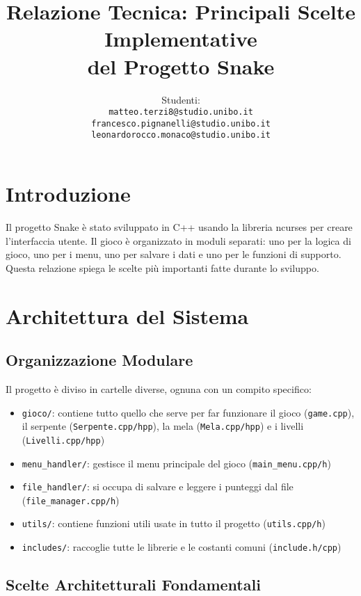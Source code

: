 \documentclass[a4paper,12pt]{article}
\title{Relazione Tecnica: Principali Scelte Implementative\\del Progetto Snake}
\author{Studenti:\\ 
\texttt{matteo.terzi8@studio.unibo.it}\\ 
\texttt{francesco.pignanelli@studio.unibo.it}\\ 
\texttt{leonardorocco.monaco@studio.unibo.it}
}
\date{}
\begin{document}
\sloppy

\maketitle

\section{Introduzione}

Il progetto Snake è stato sviluppato in C++ usando la libreria ncurses per creare l'interfaccia utente. Il gioco è organizzato in moduli separati: uno per la logica di gioco, uno per i menu, uno per salvare i dati e uno per le funzioni di supporto. Questa relazione spiega le scelte più importanti fatte durante lo sviluppo.

\section{Architettura del Sistema}

\subsection{Organizzazione Modulare}

Il progetto è diviso in cartelle diverse, ognuna con un compito specifico:

\begin{itemize}
    \item \texttt{gioco/}: contiene tutto quello che serve per far funzionare il gioco (\texttt{game.cpp}), il serpente (\texttt{Serpente.cpp/hpp}), la mela (\texttt{Mela.cpp/hpp}) e i livelli (\texttt{Livelli.cpp/hpp})
    \item \texttt{menu\_handler/}: gestisce il menu principale del gioco (\texttt{main\_menu.cpp/h})
    \item \texttt{file\_handler/}: si occupa di salvare e leggere i punteggi dal file (\texttt{file\_manager.cpp/h})
    \item \texttt{utils/}: contiene funzioni utili usate in tutto il progetto (\texttt{utils.cpp/h})
    \item \texttt{includes/}: raccoglie tutte le librerie e le costanti comuni (\texttt{include.h/cpp})
\end{itemize}

\subsection{Scelte Architetturali Fondamentali}
\end{document}
